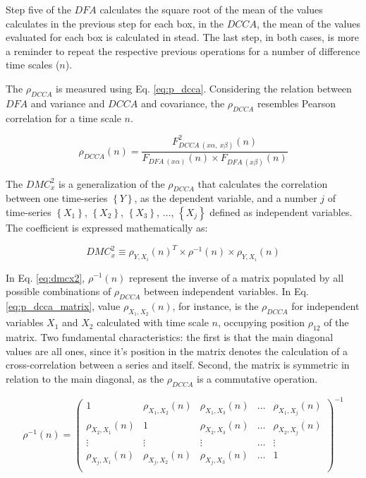 \documentclass[article]{jss}
\begin{document}
Step five of the $DFA$ calculates the square root of the mean of the values calculates in the previous step for each box, in the $DCCA$, the mean of the values evaluated for each box is calculated in stead. The last step, in both cases, is more a reminder to repeat the respective previous operations for a number of difference time scales ($n$).

The $\rho_{DCCA}$ is measured using Eq. \ref{eq:p_dcca}. Considering the relation between $DFA$ and variance and $DCCA$ and covariance, the $\rho_{DCCA}$ resembles Pearson correlation for a time scale $n$.

\begin{equation}
  {\rho}_{DCCA}(n) = \frac{F_{DCCA~(x\alpha,~x\beta)}^{2}(n)}
  {F_{DFA~(x\alpha)}(n) \times F_{DFA~(x\beta)}(n)}
  \label{eq:p_dcca}
\end{equation}

The $DMC_x^2$ is a generalization of the $\rho_{DCCA}$ that calculates the correlation between one time-series $\left\lbrace Y \right\rbrace $, as the  dependent variable, and a number $j$ of time-series $\left\lbrace X_{1} \right\rbrace $, $\left\lbrace X_{2} \right\rbrace $, $\left\lbrace X_{3} \right\rbrace $, $\dots $, $\left\lbrace X_{j} \right\rbrace $ defined as independent variables. The coefficient is expressed mathematically as:

\begin{equation}
  {DMC}_{x}^{2}  \equiv \rho_{Y,X_{i}}(n)^{T} \times \rho^{-1}(n) \times \rho_{Y,X_{i}}(n)
  \label{eq:dmcx2}
\end{equation}

In Eq. \ref{eq:dmcx2}, $\rho^{-1}(n)$ represent the inverse of a matrix populated by all possible combinations of $\rho_{DCCA}$ between independent variables. In Eq. \ref{eq:p_dcca_matrix}, value $\rho_{X_{1},X_{2}}(n)$, for instance, is the $\rho_{DCCA}$ for independent variables $X_{1}$ and $X_{2}$ calculated with time scale $n$, occupying position $\rho_{1 2}$ of the matrix. Two fundamental characteristics: the first is that the main diagonal values are all ones, since it's position in the matrix denotes the calculation of a cross-correlation between a series and itself. Second, the matrix is symmetric in relation to the main diagonal, as the $\rho_{DCCA}$ is a commutative operation.

\begin{equation}
  \rho^{-1}(n) = \left(\begin{matrix}
    1                     & \rho_{X_{1},X_{2}}(n) & \rho_{X_{1},X_{3}}(n) & \dots & \rho_{X_{1},X_{j}}(n) \\
    \rho_{X_{2},X_{1}}(n) & 1                     & \rho_{X_{2},X_{3}}(n) & \dots & \rho_{X_{2},X_{j}}(n) \\
    \vdots                & \vdots                & \vdots                & \dots & \vdots                \\
    \rho_{X_{j},X_{1}}(n) & \rho_{X_{j},X_{2}}(n) & \rho_{X_{j},X_{3}}(n) & \dots & 1                     \\
  \end{matrix}\right)^{-1}
  \label{eq:p_dcca_matrix}
\end{equation}
\end{document}
